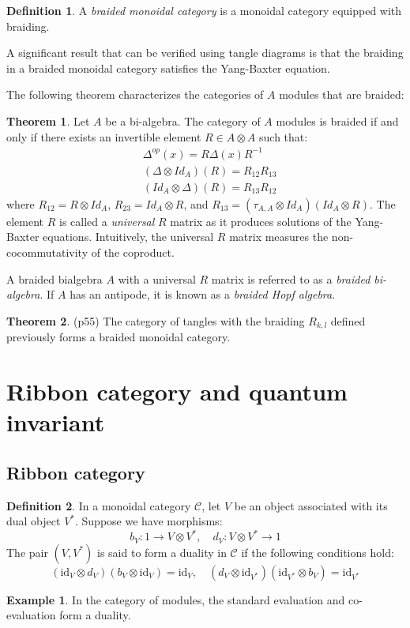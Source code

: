 \documentclass[11pt]{article}
\theoremstyle{definition}
\newtheorem{theo}{Theorem}[section]
\newtheorem{ex}{Example}[section]
\newtheorem{Def}{Definition}[section]
\begin{document}
\begin{Def}
A \textit{braided monoidal category} is a monoidal category equipped with braiding.
\end{Def}

A significant result that can be verified using tangle diagrams is that the braiding in a braided monoidal category satisfies the Yang-Baxter equation.

The following theorem characterizes the categories of \(A\) modules that are braided:
\begin{theo}
Let \(A\) be a bi-algebra. The category of \(A\) modules is braided if and only if there exists an invertible element \(R\in A\otimes A\) such that:
\begin{align*}
&\Delta^{op}(x) = R\Delta(x) R^{-1}\\
&(\Delta\otimes Id_A)(R) = R_{12}R_{13}\\
&(Id_A\otimes \Delta)(R) = R_{13}R_{12}
\end{align*}
where \(R_{12} = R\otimes Id_A\), \(R_{23} = Id_A\otimes R\), and \(R_{13} = (\tau_{A,A}\otimes Id_A)(Id_A\otimes R)\). The element \(R\) is called a \textit{universal} \(R\) matrix as it produces solutions of the Yang-Baxter equations. Intuitively, the universal \(R\) matrix measures the non-cocommutativity of the coproduct.
\vspace{0.5cm}

A braided bialgebra \(A\) with a universal \(R\) matrix is referred to as a \textit{braided bi-algebra}. If \(A\) has an antipode, it is known as a \textit{braided Hopf algebra}.
\end{theo}

\begin{theo}
\cite{KasRossTur}(p55) The category of tangles with the braiding \(R_{k,l}\) defined previously forms a braided monoidal category.
\end{theo}

\section{\Large \textbf{Ribbon category and quantum invariant}}
\subsection{\Large \textbf{Ribbon category}}
\begin{Def} In a monoidal category \(\mathcal{C}\), let \(V\) be an object associated with its dual object \(V^{*}\). Suppose we have morphisms:
\[b_V : 1\to V\otimes V^{*}, \quad d_V : V\otimes V^{*}\to 1\]
The pair \((V, V^{*})\) is said to form a duality in \(\mathcal{C}\) if the following conditions hold:
\[(\text{id}_V\otimes d_V)(b_V\otimes \text{id}_V)=\text{id}_V, \quad (d_V\otimes \text{id}_{V^{*}})(\text{id}_{V^{*}}\otimes b_V)=\text{id}_{V^{*}}\]
\begin{ex} In the category of modules, the standard evaluation and co-evaluation form a duality.
\end{ex}
\end{Def}
\end{document}
